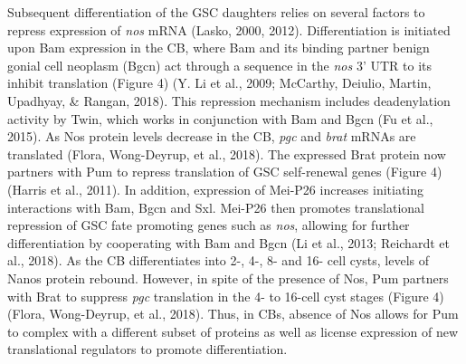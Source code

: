 \documentclass[12pt,twoside]{reedthesis}
\begin{document}
Subsequent differentiation of the GSC daughters relies on several
factors to repress expression of \emph{nos} mRNA (Lasko, 2000, 2012). Differentiation is initiated upon Bam expression in the
CB, where Bam and its binding partner benign gonial cell neoplasm (Bgcn)
act through a sequence in the \emph{nos} 3' UTR to its inhibit translation
(Figure 4) (Y. Li et al., 2009; McCarthy, Deiulio, Martin, Upadhyay, \& Rangan, 2018). This repression mechanism
includes deadenylation activity by Twin, which works in conjunction with
Bam and Bgcn (Fu et al., 2015). As Nos protein levels decrease in the CB,
\emph{pgc} and \emph{brat} mRNAs are translated (Flora, Wong-Deyrup, et al., 2018). The expressed
Brat protein now partners with Pum to repress translation of GSC
self-renewal genes (Figure 4) (Harris et al., 2011). In addition, expression
of Mei-P26 increases initiating interactions with Bam, Bgcn and Sxl.
Mei-P26 then promotes translational repression of GSC fate promoting
genes such as \emph{nos}, allowing for further differentiation by cooperating
with Bam and Bgcn (Li et al., 2013; Reichardt et al., 2018). As the CB
differentiates into 2-, 4-, 8- and 16- cell cysts, levels of Nanos
protein rebound. However, in spite of the presence of Nos, Pum partners
with Brat to suppress \emph{pgc} translation in the 4- to 16-cell cyst stages
(Figure 4) (Flora, Wong-Deyrup, et al., 2018). Thus, in CBs, absence of Nos allows for Pum
to complex with a different subset of proteins as well as license
expression of new translational regulators to promote differentiation.
\end{document}
